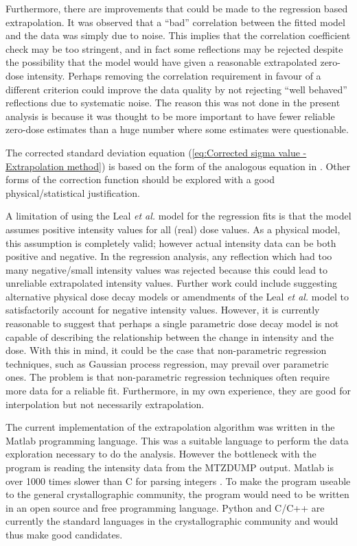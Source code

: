 Furthermore, there are improvements that could be made to the regression based extrapolation.
It was observed that a ``bad'' correlation between the fitted model and the data was simply due to noise.
This implies that the correlation coefficient check may be too stringent, and in fact some reflections may be rejected despite the possibility that the model would have given a reasonable extrapolated zero-dose intensity.
Perhaps removing the correlation requirement in favour of a different criterion could improve the data quality by not rejecting ``well behaved'' reflections due to systematic noise.
The reason this was not done in the present analysis is because it was thought to be more important to have fewer reliable zero-dose estimates than a huge number where some estimates were questionable.

The corrected standard deviation equation (\ref{eq:Corrected sigma value - Extrapolation method}) is based on the form of the analogous equation in \cite{diederichs2003}.
Other forms of the correction function should be explored with a good physical/statistical justification.

A limitation of using the Leal \textit{et al.} model for the regression fits is that the model assumes positive intensity values for all (real) dose values.
As a physical model, this assumption is completely valid; however actual intensity data can be both positive and negative.
In the regression analysis, any reflection which had too many negative/small intensity values was rejected because this could lead to unreliable extrapolated intensity values.
Further work could include suggesting alternative physical dose decay models or amendments of the Leal \textit{et al.} model to satisfactorily account for negative intensity values.
However, it is currently reasonable to suggest that perhaps a single parametric dose decay model is not capable of describing the relationship between the change in intensity and the dose.
With this in mind, it could be the case that non-parametric regression techniques, such as Gaussian process regression, may prevail over parametric ones.
The problem is that non-parametric regression techniques often require more data for a reliable fit.
Furthermore, in my own experience, they are good for interpolation but not necessarily extrapolation.

The current implementation of the extrapolation algorithm was written in the Matlab programming language.
This was a suitable language to perform the data exploration necessary to do the analysis.
However the bottleneck with the program is reading the intensity data from the MTZDUMP output.
Matlab is over 1000 times slower than C for parsing integers \cite{bezanson2014julia}.
To make the program useable to the general crystallographic community, the program would need to be written in an open source and free programming language.
Python and C/C++ are currently the standard languages in the crystallographic community and would thus make good candidates.
